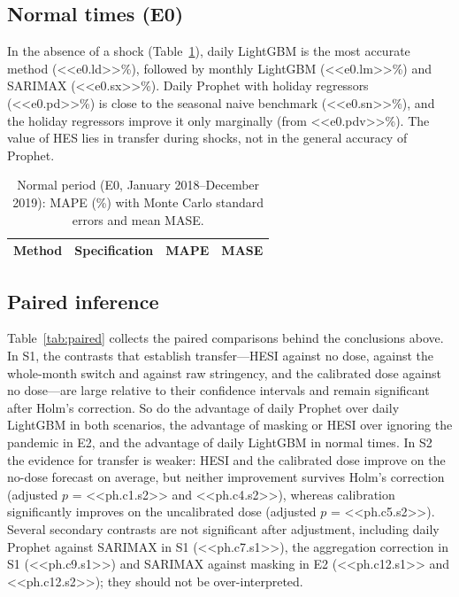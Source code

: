 \documentclass{article}
\theoremstyle{plain}
\theoremstyle{definition}
\theoremstyle{remark}
\begin{document}
\subsection{Normal times (E0)}
In the absence of a shock (Table~\ref{tab:e0}), daily LightGBM is the most accurate method (<<e0.ld>>\%), followed by monthly LightGBM (<<e0.lm>>\%) and SARIMAX (<<e0.sx>>\%). Daily Prophet with holiday regressors (<<e0.pd>>\%) is close to the seasonal naive benchmark (<<e0.sn>>\%), and the holiday regressors improve it only marginally (from <<e0.pdv>>\%). The value of HES lies in transfer during shocks, not in the general accuracy of Prophet.

\begin{table}[t]
\centering\small
\caption{Normal period (E0, January 2018--December 2019): MAPE (\%) with Monte Carlo standard errors and mean MASE.}
\label{tab:e0}
\begin{tabular}{llcc}
\toprule
Method & Specification & MAPE & MASE \\
\midrule
\bottomrule
\end{tabular}
\end{table}

\subsection{Paired inference}
Table~\ref{tab:paired} collects the paired comparisons behind the conclusions above. In S1, the contrasts that establish transfer---HESI against no dose, against the whole-month switch and against raw stringency, and the calibrated dose against no dose---are large relative to their confidence intervals and remain significant after Holm's correction. So do the advantage of daily Prophet over daily LightGBM in both scenarios, the advantage of masking or HESI over ignoring the pandemic in E2, and the advantage of daily LightGBM in normal times. In S2 the evidence for transfer is weaker: HESI and the calibrated dose improve on the no-dose forecast on average, but neither improvement survives Holm's correction (adjusted $p$ = <<ph.c1.s2>> and <<ph.c4.s2>>), whereas calibration significantly improves on the uncalibrated dose (adjusted $p$ = <<ph.c5.s2>>). Several secondary contrasts are not significant after adjustment, including daily Prophet against SARIMAX in S1 (<<ph.c7.s1>>), the aggregation correction in S1 (<<ph.c9.s1>>) and SARIMAX against masking in E2 (<<ph.c12.s1>> and <<ph.c12.s2>>); they should not be over-interpreted.
\end{document}
